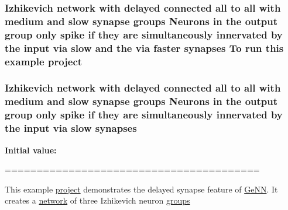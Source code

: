 \hypertarget{userproject_2SynDelay__project_2README_8txt_a762c750134e07a31b7965860fd292b51}{
\subsubsection[{project}]{\setlength{\rightskip}{0pt plus 5cm}Izhikevich {\bf network} {\bf with} delayed connected all {\bf to} all {\bf with} medium and slow synapse {\bf groups} Neurons {\bf in} the output group only spike if they are simultaneously innervated by the input via slow and the via faster {\bf synapses} To run this example project}}\label{userproject_2SynDelay__project_2README_8txt_a762c750134e07a31b7965860fd292b51}
\hypertarget{userproject_2SynDelay__project_2README_8txt_a7ef8cfd0b18b59bc74f8817d93fc159f}{
\subsubsection[{synapses}]{\setlength{\rightskip}{0pt plus 5cm}Izhikevich {\bf network} {\bf with} delayed connected all {\bf to} all {\bf with} medium and slow synapse {\bf groups} Neurons {\bf in} the output group only spike if they are simultaneously innervated by the input via slow synapses}}\label{userproject_2SynDelay__project_2README_8txt_a7ef8cfd0b18b59bc74f8817d93fc159f}
{\bfseries Initial value\+:}
\begin{DoxyCode}
========================================

This example \hyperlink{userproject_2MBody1__project_2README_8txt_a6be7686af1c095c33166a32d892865dc}{project} demonstrates the delayed synapse feature of \hyperlink{README_8txt_a431a8d9aae97c72793fee7c3edd68559}{GeNN}. It creates
a \hyperlink{userproject_2Izh__sparse__project_2README_8txt_a3b32176ef4eb1068d5341ffeb475ff7d}{network} of three Izhikevich neuron \hyperlink{README_8txt_a7517205ac314873d8c5358b4a4e6eb79}{groups}
\end{DoxyCode}
